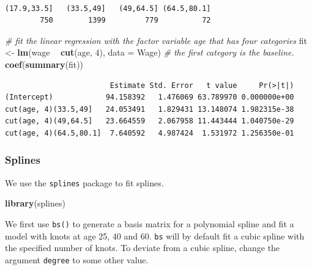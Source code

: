 \documentclass[]{article}
\newenvironment{Shaded}{\begin{snugshade}}{\end{snugshade}}
\newcommand{\CommentTok}[1]{\textcolor[rgb]{0.56,0.35,0.01}{\textit{#1}}}
\newcommand{\DataTypeTok}[1]{\textcolor[rgb]{0.13,0.29,0.53}{#1}}
\newcommand{\DecValTok}[1]{\textcolor[rgb]{0.00,0.00,0.81}{#1}}
\newcommand{\KeywordTok}[1]{\textcolor[rgb]{0.13,0.29,0.53}{\textbf{#1}}}
\newcommand{\NormalTok}[1]{#1}
\newcommand{\OperatorTok}[1]{\textcolor[rgb]{0.81,0.36,0.00}{\textbf{#1}}}
\newcommand{\StringTok}[1]{\textcolor[rgb]{0.31,0.60,0.02}{#1}}
\begin{document}
\begin{verbatim}

(17.9,33.5]   (33.5,49]   (49,64.5] (64.5,80.1] 
        750        1399         779          72 
\end{verbatim}

\begin{Shaded}
\begin{Highlighting}[]
\CommentTok{# fit the linear regression with the factor variable age that has four categories}
\NormalTok{fit <-}\StringTok{ }\KeywordTok{lm}\NormalTok{(wage }\OperatorTok{~}\StringTok{ }\KeywordTok{cut}\NormalTok{(age, }\DecValTok{4}\NormalTok{), }\DataTypeTok{data =}\NormalTok{ Wage)}
\CommentTok{# the first category is the baseline.}
\KeywordTok{coef}\NormalTok{(}\KeywordTok{summary}\NormalTok{(fit))}
\end{Highlighting}
\end{Shaded}

\begin{verbatim}
                        Estimate Std. Error   t value     Pr(>|t|)
(Intercept)            94.158392   1.476069 63.789970 0.000000e+00
cut(age, 4)(33.5,49]   24.053491   1.829431 13.148074 1.982315e-38
cut(age, 4)(49,64.5]   23.664559   2.067958 11.443444 1.040750e-29
cut(age, 4)(64.5,80.1]  7.640592   4.987424  1.531972 1.256350e-01
\end{verbatim}

\hypertarget{splines}{%
\subsubsection{Splines}\label{splines}}

We use the \texttt{splines} package to fit splines.

\begin{Shaded}
\begin{Highlighting}[]
\KeywordTok{library}\NormalTok{(splines)}
\end{Highlighting}
\end{Shaded}

We first use \texttt{bs()} to generate a basis matrix for a polynomial spline and fit a model with knots at age 25, 40 and 60. \texttt{bs} will by default fit a cubic spline with the specified number of knots. To deviate from a cubic spline, change the argument \texttt{degree} to some other value.
\end{document}
